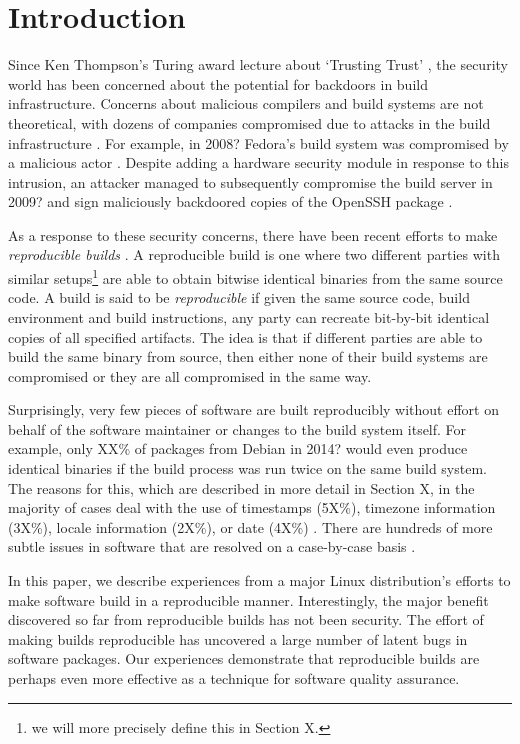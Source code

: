 \section{Introduction}
\label{SEC:introduction}

Since Ken Thompson's Turing award lecture about `Trusting Trust' 
, the security world has been concerned about the potential
for backdoors in build infrastructure.  Concerns about malicious compilers
and build systems are not
theoretical, with dozens of companies compromised due to attacks in the
build infrastructure .  For example, in 2008?
Fedora's build system was compromised by a malicious actor .
Despite adding a hardware security module in response to this intrusion, 
an attacker managed to subsequently compromise the build server in 2009? 
and sign maliciously backdoored copies of the OpenSSH package
.

As a response to these security concerns, there have been recent
efforts to make \emph{reproducible builds} .  A reproducible
build is one where two different parties with similar setups\footnote{we 
will more precisely define this in Section X.} are able 
to obtain bitwise identical binaries from the same source code.
A build is said to be \emph{reproducible} if given the same source code, build
environment and build instructions, any party can recreate bit-by-bit identical
copies of all specified artifacts.
The idea is that if different parties are able to build the same binary
from source, then either none of their build systems are compromised or
they are all compromised in the same way.

Surprisingly, very few pieces of software are built reproducibly without
effort on behalf of the software maintainer or changes to the build system
itself.  For example, only XX\% of packages from Debian in 2014? would even
produce identical binaries if the build process was run twice on the same
build system.  The reasons for this, which are described in more detail
in Section X, in the majority of cases deal with the use
of timestamps (5X\%), timezone information (3X\%), locale information
(2X\%), or date (4X\%) .  There are hundreds of
more subtle issues in software that are resolved on a case-by-case basis
.

In this paper, we describe experiences from a major Linux distribution's
efforts to make software build in a reproducible manner.  Interestingly,
the major benefit discovered so far from reproducible builds has not been 
security.  The effort of making builds reproducible has uncovered a large
number of latent bugs in software packages.  Our experiences demonstrate
that reproducible builds are perhaps even more effective as a technique
for software quality assurance.

